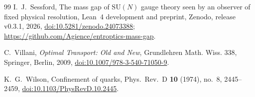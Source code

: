 \documentclass[11pt]{amsart}
\theoremstyle{definition}
\theoremstyle{remark}
\numberwithin{equation}{section}
\newcommand{\SU}{\mathrm{SU}}
\begin{document}
\begin{thebibliography}{99}
I.~J.~Sessford, The mass gap of $\SU(N)$ gauge theory seen by an observer of
fixed physical resolution, Lean~4 development and preprint, Zenodo, release
v0.3.1, 2026,
\href{https://doi.org/10.5281/zenodo.24073388}{doi:10.5281/zenodo.24073388};
\url{https://github.com/Agience/entroptics-mass-gap}.

C.~Villani, \emph{Optimal Transport: Old and New}, Grundlehren Math. Wiss.
338, Springer, Berlin, 2009,
\href{https://doi.org/10.1007/978-3-540-71050-9}{doi:10.1007/978-3-540-71050-9}.

K.~G.~Wilson, Confinement of quarks, Phys.\ Rev.\ D \textbf{10} (1974), no.~8, 2445--2459,
\href{https://doi.org/10.1103/PhysRevD.10.2445}{doi:10.1103/\allowbreak PhysRevD.10.2445}.

\end{thebibliography}
\end{document}
